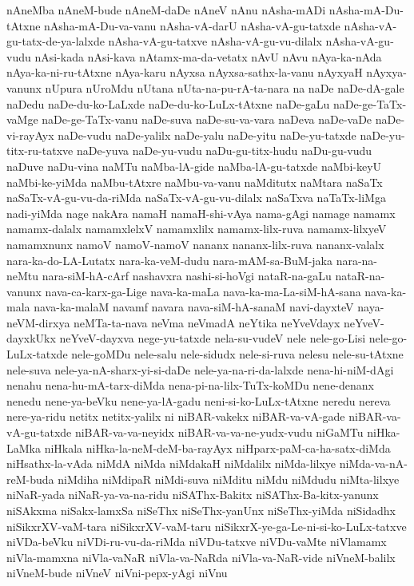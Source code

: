 {nAneMba
nAneM-bude
nAneM-daDe
nAneV
nAnu
nAsha-mADi
nAsha-mA-Du-tAtxne
nAsha-mA-Du-va-vanu
nAsha-vA-darU
nAsha-vA-gu-tatxde
nAsha-vA-gu-tatx-de-ya-lalxde
nAsha-vA-gu-tatxve
nAsha-vA-gu-vu-dilalx
nAsha-vA-gu-vudu
nAsi-kada
nAsi-kava
nAtamx-ma-da-vetatx
nAvU
nAvu
nAya-ka-nAda
nAya-ka-ni-ru-tAtxne
nAya-karu
nAyxsa
nAyxsa-sathx-la-vanu
nAyxyaH
nAyxya-vanunx
nUpura
nUroMdu
nUtana
nUta-na-pu-rA-ta-nara
na
naDe
naDe-dA-gale
naDedu
naDe-du-ko-LaLxde
naDe-du-ko-LuLx-tAtxne
naDe-gaLu
naDe-ge-TaTx-vaMge
naDe-ge-TaTx-vanu
naDe-suva
naDe-su-va-vara
naDeva
naDe-vaDe
naDe-vi-rayAyx
naDe-vudu
naDe-yalilx
naDe-yalu
naDe-yitu
naDe-yu-tatxde
naDe-yu-titx-ru-tatxve
naDe-yuva
naDe-yu-vudu
naDu-gu-titx-hudu
naDu-gu-vudu
naDuve
naDu-vina
naMTu
naMba-lA-gide
naMba-lA-gu-tatxde
naMbi-keyU
naMbi-ke-yiMda
naMbu-tAtxre
naMbu-va-vanu
naMditutx
naMtara
naSaTx
naSaTx-vA-gu-vu-da-riMda
naSaTx-vA-gu-vu-dilalx
naSaTxva
naTaTx-liMga
nadi-yiMda
nage
nakAra
namaH
namaH-shi-vAya
nama-gAgi
namage
namamx
namamx-dalalx
namamxlelxV
namamxlilx
namamx-lilx-ruva
namamx-lilxyeV
namamxnunx
namoV
namoV-namoV
nananx
nananx-lilx-ruva
nananx-valalx
nara-ka-do-LA-Lutatx
nara-ka-veM-dudu
nara-mAM-sa-BuM-jaka
nara-na-neMtu
nara-siM-hA-cArf
nashavxra
nashi-si-hoVgi
nataR-na-gaLu
nataR-na-vanunx
nava-ca-karx-ga-Lige
nava-ka-maLa
nava-ka-ma-La-siM-hA-sana
nava-ka-mala
nava-ka-malaM
navamf
navara
nava-siM-hA-sanaM
navi-dayxteV
naya-neVM-dirxya
neMTa-ta-nava
neVma
neVmadA
neYtika
neYveVdayx
neYveV-dayxkUkx
neYveV-dayxva
nege-yu-tatxde
nela-su-vudeV
nele
nele-go-Lisi
nele-go-LuLx-tatxde
nele-goMDu
nele-salu
nele-sidudx
nele-si-ruva
nelesu
nele-su-tAtxne
nele-suva
nele-ya-nA-sharx-yi-si-daDe
nele-ya-na-ri-da-lalxde
nena-hi-niM-dAgi
nenahu
nena-hu-mA-tarx-diMda
nena-pi-na-lilx-TuTx-koMDu
nene-denanx
nenedu
nene-ya-beVku
nene-ya-lA-gadu
neni-si-ko-LuLx-tAtxne
neredu
nereva
nere-ya-ridu
netitx
netitx-yalilx
ni
niBAR-vakekx
niBAR-va-vA-gade
niBAR-va-vA-gu-tatxde
niBAR-va-va-neyidx
niBAR-va-va-ne-yudx-vudu
niGaMTu
niHka-LaMka
niHkala
niHka-la-neM-deM-ba-rayAyx
niHparx-paM-ca-ha-satx-diMda
niHsathx-la-vAda
niMdA
niMda
niMdakaH
niMdalilx
niMda-lilxye
niMda-va-nA-reM-buda
niMdiha
niMdipaR
niMdi-suva
niMditu
niMdu
niMdudu
niMta-lilxye
niNaR-yada
niNaR-ya-va-na-ridu
niSAThx-Bakitx
niSAThx-Ba-kitx-yanunx
niSAkxma
niSakx-lamxSa
niSeThx
niSeThx-yanUnx
niSeThx-yiMda
niSidadhx
niSikxrXV-vaM-tara
niSikxrXV-vaM-taru
niSikxrX-ye-ga-Le-ni-si-ko-LuLx-tatxve
niVDa-beVku
niVDi-ru-vu-da-riMda
niVDu-tatxve
niVDu-vaMte
niVlamamx
niVla-mamxna
niVla-vaNaR
niVla-va-NaRda
niVla-va-NaR-vide
niVneM-balilx
niVneM-bude
niVneV
niVni-pepx-yAgi
niVnu
}
